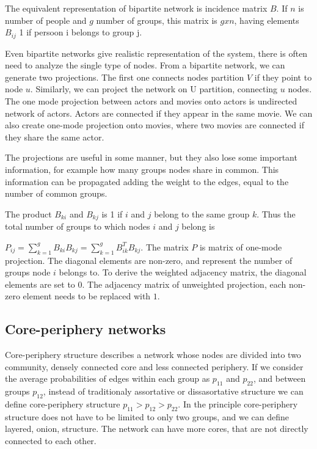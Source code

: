 The equivalent representation of bipartite network is incidence matrix $B$. If $n$ is number of people and $g$ number of groups, this matrix is $g x n$, having elements $B_{ij}$ 1 if persoon i belongs to group j. 

Even bipartite networks give realistic representation of the system, there is often need to analyze the single type of nodes.  From a bipartite network, we can generate two projections. The first one connects nodes partition $V$ if they point to node $u$. Similarly, we can project the network on U partition, connecting $u$ nodes. The one mode projection between actors and movies onto actors is undirected network of actors. Actors are connected if they appear in the same movie. We can also create one-mode projection onto movies, where two movies are connected if they share the same actor.  

The projections are useful in some manner, but they also lose some important information, for example how many groups nodes share in common. This information can be propagated adding the weight to the edges, equal to the number of common groups.

The product $B_{ki}$ and $B_{kj}$ is 1 if $i$ and $j$ belong to the same group $k$. Thus the total number of groups to which nodes $i$ and $j$ belong is 

$P_{ij} = \sum_{k=1}^g B_{ki}B_{kj} = \sum_{k=1}^g B_{ik}^TB_{kj}$. The matrix $P$ is matrix of one-mode projection. The diagonal elements are non-zero, and represent the number of groups node $i$ belongs to.  To derive the weighted adjacency matrix, the diagonal elements are set to 0. The adjacency matrix of unweighted projection, each non-zero element needs to be replaced with $1$. 

\subsection{Core-periphery networks}

Core-periphery structure describes a network whose nodes are divided into two community, densely connected core and less connected periphery. If we consider the average probabilities of edges within each group as $p_{11}$ and $p_{22}$, and between groups $p_{12}$, instead of traditionaly assortative or dissasortative structure we can define core-periphery structure $p_{11}> p_{12} > p_{22}$. In the principle core-periphery structure does not have to be limited to only two groups, and we can define layered, onion, structure. The network can have more cores, that are not directly connected to each other. 

